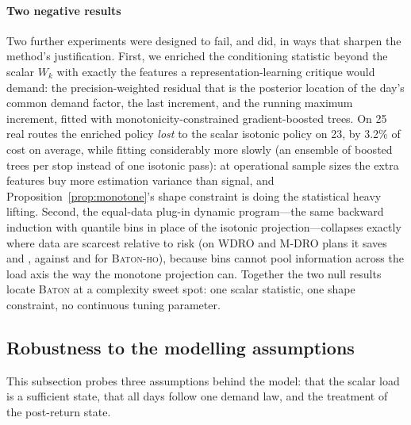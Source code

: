 \documentclass[preprint,authoryear,12pt]{elsarticle}
\theoremstyle{definition}
\theoremstyle{remark}
\begin{document}


\paragraph{Two negative results} Two further experiments were designed
to fail, and did, in ways that sharpen the method's justification.
First, we enriched the conditioning statistic beyond the scalar $W_k$
with exactly the features a representation-learning critique would
demand: the precision-weighted residual that is the posterior location
of the day's common demand factor, the last increment, and the running
maximum increment, fitted with monotonicity-constrained gradient-boosted
trees. On 25 real routes the enriched policy \emph{lost} to the scalar
isotonic policy on 23, by 3.2\% of cost on average, while fitting
considerably more slowly (an ensemble of boosted trees per stop instead
of one isotonic pass): at operational sample sizes the extra
features buy more estimation variance than signal, and
Proposition~\ref{prop:monotone}'s shape constraint is doing the
statistical heavy lifting. Second, the equal-data plug-in dynamic
program---the same backward induction with quantile bins in place of
the isotonic projection---collapses exactly where data are scarcest
relative to risk (on \textsc{WDRO} and \textsc{M-DRO} plans it saves
\svWDRODpN{} and \svMDRODpN{}, against \svWDROHo{} and \svMDROHo{}
for \textsc{Baton-ho}), because bins cannot pool information across
the load axis the way the monotone projection can. Together the two
null results locate \textsc{Baton} at a complexity sweet spot: one
scalar statistic, one shape constraint, no continuous tuning parameter.

\subsection{Robustness to the modelling assumptions}\label{sec:robust}

This subsection probes three assumptions behind the model: that the
scalar load is a sufficient state, that all days follow one demand law,
and the treatment of the post-return state.
\end{document}
